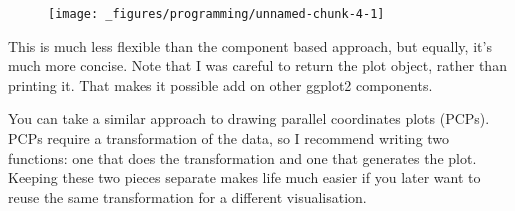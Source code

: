 \begin{Shaded}
\begin{Highlighting}[]
\StringTok{ }
\StringTok{    }\NormalTok{(} \NormalTok{) +}\StringTok{ }
\StringTok{    }\NormalTok{(} \NormalTok{) +}\StringTok{ }
\StringTok{    }\NormalTok{(}\NormalTok{) +}\StringTok{ }
\StringTok{    }\NormalTok{(}\NormalTok{)}
\NormalTok{\}}
\NormalTok{(}\NormalTok{(}\NormalTok{), } 
\end{Highlighting}
\end{Shaded}

\begin{figure}[H]
  \centering
  \texttt{[image: \_figures/programming/unnamed-chunk-4-1]}
\end{figure}

This is much less flexible than the component based approach, but
equally, it's much more concise. Note that I was careful to return the
plot object, rather than printing it. That makes it possible add on
other ggplot2 components.

You can take a similar approach to drawing parallel coordinates plots
(PCPs). PCPs require a transformation of the data, so I recommend
writing two functions: one that does the transformation and one that
generates the plot. Keeping these two pieces separate makes life much
easier if you later want to reuse the same transformation for a
different visualisation. 


